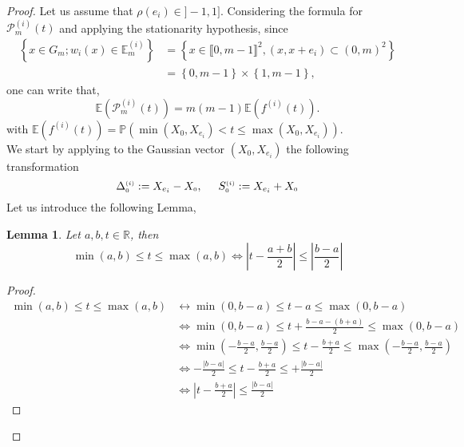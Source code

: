 \documentclass[12pt]{article}
\theoremstyle{Theorem}
\newtheorem{Lemma}[Theorem]{Lemma}
\begin{document}
\begin{proof}
Let us assume that $\rho(e_{i}) \in ]-1,1]$. Considering the formula for $\mathcal{P}^{\scriptscriptstyle  (i)}_{m}(t)$ and applying the stationarity hypothesis, since
\begin{align*}
\left\{ x \in G_{m}; w_{i}(x) \in \mathbb{E}^{\scriptscriptstyle  (i)}_{m}\right\} & = \left\{x \in \llbracket 0, m-1 \rrbracket^{2}, (x, x+e_i)\subset (0,m)^{2} \right\} \\ 
& = \left\{ 0, m-1 \right\} \times \left\{ 1, m - 1\right\},
\end{align*}
one can write that, 
\begin{equation*}
\mathbb{E}\left(\mathcal{P}^{\scriptscriptstyle  (i)}_{m}(t) \right) = m(m-1)\mathbb{E}\left(f^{(i)}(t)\right).
\label{covarianeproof}
\end{equation*}
 with $\mathbb{E}\left(f^{(i)}(t)\right) = \mathbb{P}\left(\min\left(X_{\scriptscriptstyle 0}, X_{e_i}\right) < t \leq \max\left(X_{\scriptscriptstyle 0}, X_{e_i}\right)\right)$. \\
 We start by applying to the Gaussian vector $\left(X_{\scriptscriptstyle 0}, X_{e_i}\right)$ the following transformation \begin{equation*} \label{expressions} \Delta^{\scriptscriptstyle (i)}_{\scriptscriptstyle 0} := X_{e_i} - X_{\scriptscriptstyle 0}, \hspace{0.5cm} S^{\scriptscriptstyle (i)}_{\scriptscriptstyle 0} := X_{e_i} + X_{\scriptscriptstyle 0}\end{equation*}
Let us introduce the following Lemma, 
\begin{Lemma}
\label{lemmasommediff}
Let $a,b,t \in \mathbb{R}$, then 
$$\min(a,b) \leq t \leq \max(a,b) \iff\left|t - \frac{a+b}{2}\right| \leq \left| \frac{ b-a }{2}\right| $$
\end{Lemma}
\begin{proof}
\begin{align*}
\min(a,b) \leq t \leq \max(a,b) & \leftrightarrow \min(0, b - a) \leq t - a \leq \max(0, b - a) \\
& \iff \min(0, b - a) \leq t + \frac{b-a - (b+a)}{2} \leq \max(0, b - a) \\
& \iff\min(- \frac{b-a}{2}, \frac{b - a}{2}) \leq t -\frac{b+a}{2} \leq \max(- \frac{b-a}{2}, \frac{b-a}{2}) \\
& \iff - \frac{\left|b-a\right|}{2} \leq t -\frac{b+a}{2} \leq + \frac{\left|b-a\right|}{2} \\
& \iff \left|t -\frac{b+a}{2}\right| \leq \frac{\left|b-a\right|}{2}

\end{align*}
\end{proof}
\end{proof}
\end{document}
